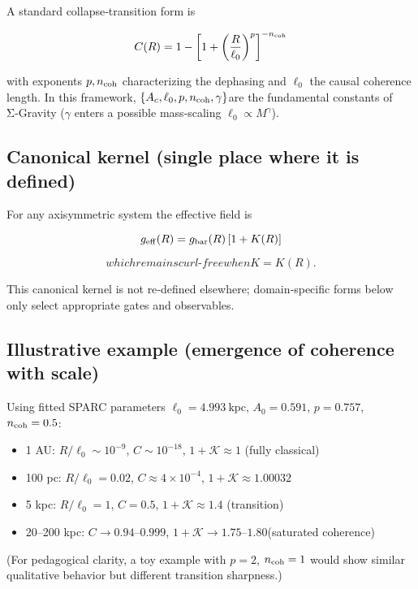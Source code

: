 \documentclass[11pt,a4paper]{article}
\begin{document}
A standard collapse‑transition form is


\begin{equation}
C(R) = 1 - \left[1 + \left(\frac{R}{\ell_0}\right)^p\right]^{-n_{\rm coh}}
\end{equation}


with exponents $p,n_{\rm coh}$ characterizing the dephasing and $\ell_0$ the causal coherence length. In this framework, $\allowbreak \{A_c,\ell_0,p,n_{\rm coh},\gamma\}$\allowbreak  are the fundamental constants of Σ‑Gravity ($\gamma$ enters a possible mass‑scaling $\ell_0\propto M^{\gamma}$).


\subsection{Canonical kernel (single place where it is defined)}


For any axisymmetric system the effective field is


\begin{equation}
 g_{\rm eff}(R) = g_{\rm bar}(R)\,[1 + K(R)] 
\end{equation}


\[
which remains curl‑free when K = K(R).
\]


This canonical kernel is not re‑defined elsewhere; domain‑specific forms below only select appropriate gates and observables.


\subsection{Illustrative example (emergence of coherence with scale)}


Using fitted SPARC parameters $\ell_0=4.993~\mathrm{kpc}$, $A_0=0.591$, $p=0.757$, $n_{\rm coh}=0.5$:


\begin{itemize}
\item 1 AU: $R/\ell_0\sim10^{-9}$, $C\sim10^{-18}$, $1+\mathcal{K}\approx1$ (fully classical)
\item 100 pc: $R/\ell_0=0.02$, $C\approx4\times10^{-4}$, $1+\mathcal{K}\approx1.00032$
\item 5 kpc: $R/\ell_0=1$, $C=0.5$, $1+\mathcal{K}\approx1.4$ (transition)
\item 20–200 kpc: $C\to0.94\text{–}0.999$, $\allowbreak 1+\mathcal{K}\to1.75\text{–}1.80$\allowbreak  (saturated coherence)
\end{itemize}


(For pedagogical clarity, a toy example with $p=2$, $n_{\rm coh}=1$ would show similar qualitative behavior but different transition sharpness.)
\end{document}
